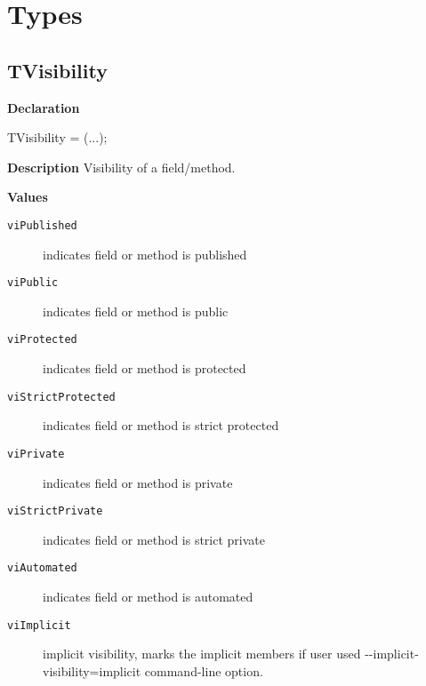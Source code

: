 \documentclass{report}
\newif\ifpdf
\begin{document}
\section{Types}
\ifpdf
\subsection*{\large{\textbf{TVisibility}}\normalsize\hspace{1ex}\hrulefill}
\else
\subsection*{TVisibility}
\fi
\label{PasDoc_Items-TVisibility}
\begin{list}{}{
\setlength{\itemindent}{0cm}
\setlength{\listparindent}{0cm}
\setlength{\leftmargin}{\evensidemargin}
\addtolength{\leftmargin}{\tmplength}
\settowidth{\labelsep}{X}
\addtolength{\leftmargin}{\labelsep}
\setlength{\labelwidth}{\tmplength}
}
\item[\textbf{Declaration}\hfill]
\ifpdf
\begin{flushleft}
\fi
\begin{ttfamily}
TVisibility = (...);\end{ttfamily}

\ifpdf
\end{flushleft}
\fi

\par
\item[\textbf{Description}]
Visibility of a field/method.\item[\textbf{Values}]
\begin{description}
\item[\texttt{viPublished}] \label{PasDoc_Items-viPublished}
\index{}
indicates field or method is published
\item[\texttt{viPublic}] \label{PasDoc_Items-viPublic}
\index{}
indicates field or method is public
\item[\texttt{viProtected}] \label{PasDoc_Items-viProtected}
\index{}
indicates field or method is protected
\item[\texttt{viStrictProtected}] \label{PasDoc_Items-viStrictProtected}
\index{}
indicates field or method is strict protected
\item[\texttt{viPrivate}] \label{PasDoc_Items-viPrivate}
\index{}
indicates field or method is private
\item[\texttt{viStrictPrivate}] \label{PasDoc_Items-viStrictPrivate}
\index{}
indicates field or method is strict private
\item[\texttt{viAutomated}] \label{PasDoc_Items-viAutomated}
\index{}
indicates field or method is automated
\item[\texttt{viImplicit}] \label{PasDoc_Items-viImplicit}
\index{}
implicit visibility, marks the implicit members if user used {-}{-}implicit{-}visibility=implicit command{-}line option.
\end{description}


\end{list}
\ifpdf
\end{document}
